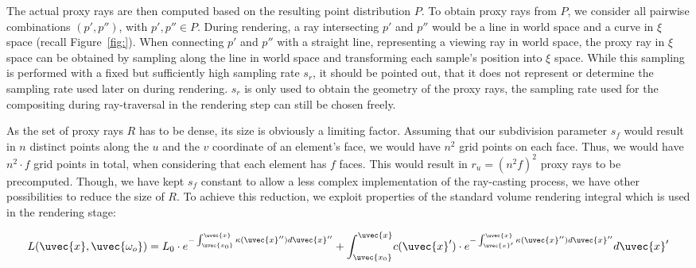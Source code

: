 \documentclass[review,journal]{vgtc}         %
\begin{document}
The actual proxy rays are then computed based on the resulting point distribution $P$. To obtain proxy rays from $P$, we consider all pairwise combinations $(p',p'')$, with $p',p'' \in P$. During rendering, a ray intersecting $p'$ and $p''$ would be a line in world space and a curve in $\xi$ space (recall Figure~\ref{fig:}). When connecting $p'$ and $p''$ with a straight line, representing a viewing ray in world space, the proxy ray in $\xi$ space can be obtained by sampling along the line in world space and transforming each sample's position into $\xi$ space. While this sampling is performed with a fixed but sufficiently high sampling rate $s_r$, it should be pointed out, that it does not represent or determine the sampling rate used later on during rendering. $s_r$ is only used to obtain the geometry of the proxy rays, the sampling rate used for the compositing during ray-traversal in the rendering step can still be chosen freely.

As the set of proxy rays $R$ has to be dense, its size is obviously a limiting factor. Assuming that our subdivision parameter $s_f$ would result in $n$ distinct points along the $u$ and the $v$ coordinate of an element's face, we would have $n^2$ grid points on each face. Thus, we would have $n^2 \cdot f$ grid points in total, when considering that each element has $f$ faces. This would result in $r_u = (n^2 f)^2$ proxy rays to be precomputed. Though, we have kept $s_f$ constant to allow a less complex implementation of the ray-casting process, we have other possibilities to reduce the size of $R$. To achieve this reduction, we exploit properties of the standard volume rendering integral which is used in the rendering stage:

$$ L(\uvec{x},\uvec{\omega_o}) = L_0 \cdot e^{-\int_{\uvec{x_0}}^{\uvec{x}}\kappa(\uvec{x}'')d\uvec{x}''} + \int_{\uvec{x_0}}^{\uvec{x}}  \! c(\uvec{x}') \cdot e^{-\int_{\uvec{x}'}^{\uvec{x}}\kappa(\uvec{x}'')d\uvec{x}''} d\uvec{x}'$$
\end{document}
